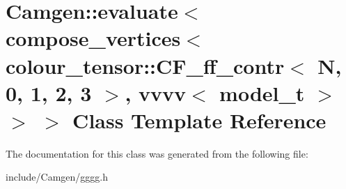 \hypertarget{a00160}{}\section{Camgen\+:\+:evaluate$<$ compose\+\_\+vertices$<$ colour\+\_\+tensor\+:\+:C\+F\+\_\+ff\+\_\+contr$<$ N, 0, 1, 2, 3 $>$, vvvv$<$ model\+\_\+t $>$ $>$ $>$ Class Template Reference}
\label{a00160}


The documentation for this class was generated from the following file\+:\begin{DoxyCompactItemize}
\item 
include/\+Camgen/gggg.\+h\end{DoxyCompactItemize}
